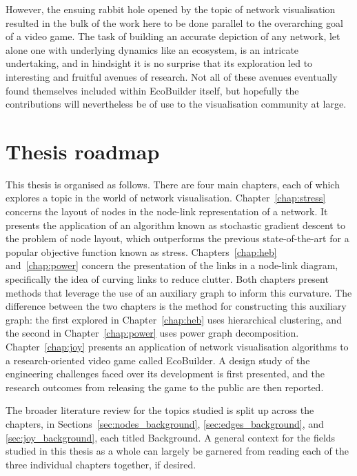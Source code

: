 However, the ensuing rabbit hole opened by the topic of network visualisation resulted in the bulk of the work here to be done parallel to the overarching goal of a video game. The task of building an accurate depiction of any network, let alone one with underlying dynamics like an ecosystem, is an intricate undertaking, and in hindsight it is no surprise that its exploration led to interesting and fruitful avenues of research.
Not all of these avenues eventually found themselves included within EcoBuilder itself, but hopefully the contributions will nevertheless be of use to the visualisation community at large.

\section{Thesis roadmap}
This thesis is organised as follows. There are four main chapters, each of which explores a topic in the world of network visualisation. Chapter~\ref{chap:stress} concerns the layout of nodes in the node-link representation of a network. It presents the application of an algorithm known as stochastic gradient descent to the problem of node layout, which outperforms the previous state-of-the-art for a popular objective function known as stress.
Chapters~\ref{chap:heb} and~\ref{chap:power} concern the presentation of the links in a node-link diagram, specifically the idea of curving links to reduce clutter. Both chapters present methods that leverage the use of an auxiliary graph to inform this curvature.
The difference between the two chapters is the method for constructing this auxiliary graph: the first explored in Chapter~\ref{chap:heb} uses hierarchical clustering, and the second in Chapter~\ref{chap:power} uses power graph decomposition.
Chapter~\ref{chap:joy} presents an application of network visualisation algorithms to a research-oriented video game called EcoBuilder. A design study of the engineering challenges faced over its development is first presented, and the research outcomes from releasing the game to the public are then reported.

The broader literature review for the topics studied is split up across the chapters, in Sections~\ref{sec:nodes_background}, \ref{sec:edges_background}, and \ref{sec:joy_background}, each titled Background. A general context for the fields studied in this thesis as a whole can largely be garnered from reading each of the three individual chapters together, if desired. 


